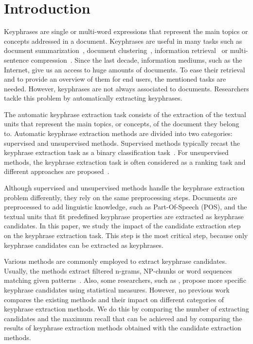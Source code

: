 \section{Introduction}
\label{sec:section}
  Keyphrases are single or multi-word expressions that represent the main topics
  or concepts addressed in a document. Keyphrases are useful in many tasks such
  as document summarization~\cite{avanzo2005keyphrase}, document
  clustering~\cite{han2007webdocumentclustering}, information
  retrieval~\cite{medelyan2008smalltrainingset} or multi-sentence
  compression~\cite{boudin2013multisentencecompression}.
  Since the last decade, information mediums, such as the Internet, give us an
  access to huge amounts of documents. To ease their retrieval and to provide an
  overview of them for end users, the mentioned tasks are needed. However,
  keyphrases are not always associated to documents. Researchers tackle this
  problem by automatically extracting keyphrases.

  The automatic keyphrase extraction task consists of the extraction of the
  textual units that represent the main topics, or concepts, of the document
  they belong to. Automatic keyphrase extraction methods are divided into two
  categories: supervised and unsupervised methods. Supervised methods typically
  recast the keyphrase extraction task as a binary classification
  task~\cite{witten1999kea}. For unsupervised methods, the keyphrase extraction
  task is often considered as a ranking task and different approaches are
  proposed~\cite{hassan2010conundrums}.

  Although supervised and unsupervised methods handle the keyphrase extraction
  problem differently, they rely on the same preprocessing steps. Documents are
  preprocessed to add linguistic knowledge, such as Part-Of-Speech (POS), and
  the textual units that fit predefined keyphrase properties are extracted as
  keyphrase candidates. In this paper, we study the impact of the candidate
  extraction step on the keyphrase extraction task. This step is the most
  critical step, because only keyphrase candidates can be extracted as
  keyphrases.

  Various methods are commonly employed to extract keyphrase candidates.
  Usually, the methods extract filtered n-grams, NP-chunks or word sequences
  matching given patterns~\cite{hulth2003keywordextraction}. Also, some
  researchers, such as ,
  propose more specific keyphrase candidates using statistical measures.
  However, no previous work compares the existing methods and their impact on
  different categories of keyphrase extraction methods. We do this by comparing
  the number of extracting candidates and the maximum recall that can be
  achieved and by comparing the results of keyphrase extraction methods
  obtained with the candidate extraction methods.

